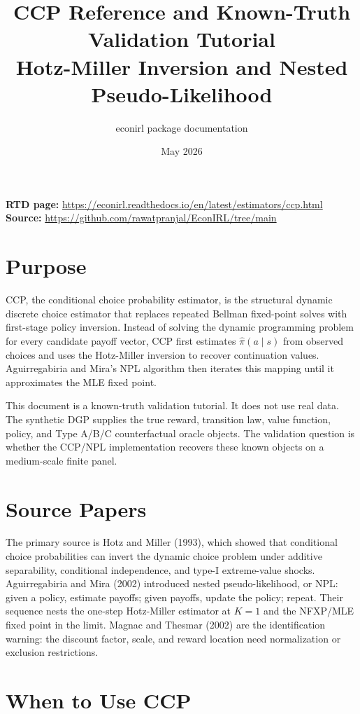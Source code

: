 \documentclass[10pt]{article}
\title{CCP Reference and Known-Truth Validation Tutorial\\[3pt]
\large Hotz-Miller Inversion and Nested Pseudo-Likelihood}
\author{econirl package documentation}
\date{May 2026}
\begin{document}
\maketitle

\begin{center}
\small
\textbf{RTD page:}
\url{https://econirl.readthedocs.io/en/latest/estimators/ccp.html}
\quad
\textbf{Source:}
\url{https://github.com/rawatpranjal/EconIRL/tree/main}
\end{center}

\section{Purpose}

CCP, the conditional choice probability estimator, is the structural dynamic
discrete choice estimator that replaces repeated Bellman fixed-point solves
with first-stage policy inversion. Instead of solving the dynamic programming
problem for every candidate payoff vector, CCP first estimates
\(\hat\pi(a\mid s)\) from observed choices and uses the Hotz-Miller inversion
to recover continuation values. Aguirregabiria and Mira's NPL algorithm then
iterates this mapping until it approximates the MLE fixed point.

This document is a known-truth validation tutorial. It does not use real data.
The synthetic DGP supplies the true reward, transition law, value function,
policy, and Type A/B/C counterfactual oracle objects. The validation question
is whether the CCP/NPL implementation recovers these known objects on a
medium-scale finite panel.

\section{Source Papers}

The primary source is Hotz and Miller (1993), which showed that conditional
choice probabilities can invert the dynamic choice problem under additive
separability, conditional independence, and type-I extreme-value shocks.
Aguirregabiria and Mira (2002) introduced nested pseudo-likelihood, or NPL:
given a policy, estimate payoffs; given payoffs, update the policy; repeat.
Their sequence nests the one-step Hotz-Miller estimator at \(K=1\) and the
NFXP/MLE fixed point in the limit. Magnac and Thesmar (2002) are the
identification warning: the discount factor, scale, and reward location need
normalization or exclusion restrictions.

\section{When to Use CCP}
\end{document}
